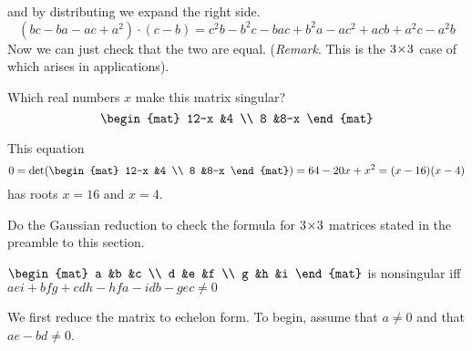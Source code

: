 \begin{exercises}
\begin{answer}
\begin{equation*}
       \end{equation*}
       and by distributing we expand the right side.
       \begin{equation*}
         (bc-ba-ac+a^2)\cdot(c-b)
         =c^2b-b^2c-bac+b^2a-ac^2+acb+a^2c-a^2b
       \end{equation*}
       Now we can just check that the two are equal.
       (\textit{Remark}.
       This is the \( 3 \! \times \! 3 \) case of
        which arises in applications).
     \end{answer}
   \recommended \item 
      Which real numbers \( x \) make this matrix singular?
      \begin{equation*}
         \begin{mat}
            12-x  &4  \\
            8    &8-x
         \end{mat}
      \end{equation*}
      \begin{answer}
         This equation
         \begin{equation*}
           0=
           \det(
             \begin{mat}
                12-x  &4  \\
                8    &8-x
             \end{mat}
           )
           =64-20x+x^2
           =(x-16)(x-4) 
       \end{equation*}
       has roots \( x=16 \) and \( x=4 \).  
     \end{answer}
  \item \label{exer:ThreeByThreeDetForm} 
    Do the Gaussian reduction to check
    the formula for $3 \! \times \! 3$ matrices stated in the preamble to
    this section.
    \begin{center}
      \( \begin{mat}
               a  &b  &c  \\
               d  &e  &f  \\
               g  &h  &i
         \end{mat} \)
      is nonsingular iff
      \( aei+bfg+cdh-hfa-idb-gec \neq 0 \)
    \end{center}
    \begin{answer}
      We first reduce the matrix to echelon form.
      To begin, assume that \( a\neq 0 \) and that \( ae-bd\neq 0 \).
      \begin{eqnarray*}

\end{eqnarray*}
\end{answer}
\end{exercises}
